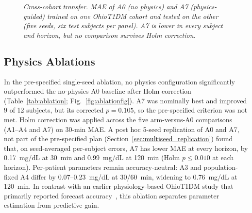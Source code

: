 \documentclass[journal]{IEEEtran}
\begin{document}
\begin{figure}[t]
\centering
{}
\caption{\small\textit{Cross-cohort transfer. MAE of A0 (no physics) and A7 (physics-guided) trained on one OhioT1DM cohort and tested on the other (five seeds, six test subjects per panel). A7 is lower in every subject and horizon, but no comparison survives Holm correction.}}
\label{fig:cross_cohort}
\end{figure}


\subsection{Physics Ablations}
In the pre-specified single-seed ablation, no physics configuration significantly outperformed the no-physics A0 baseline after Holm correction (Table~\ref{tab:ablation}; Fig.~\ref{fig:ablationfig}). A7 was nominally best and improved 9 of 12 subjects, but its corrected $p = 0.105$, so the pre-specified criterion was not met. Holm correction was applied across the five arm-versus-A0 comparisons (A1--A4 and A7) on 30-min MAE. A post hoc 5-seed replication of A0 and A7, not part of the pre-specified plan (Section~\ref{sec:multiseed_replication}) found that, on seed-averaged per-subject errors, A7 has lower MAE at every horizon, by 0.17~mg/dL at 30~min and 0.99~mg/dL at 120~min (Holm $p \le 0.010$ at each horizon). Per-patient parameters remain accuracy-neutral: A3 and population-fixed A4 differ by 0.07--0.23~mg/dL at 30/60~min, widening to 0.76~mg/dL at 120~min. In contrast with an earlier physiology-based OhioT1DM study that primarily reported forecast accuracy~\cite{ref58}, this ablation separates parameter estimation from predictive gain.
\end{document}
